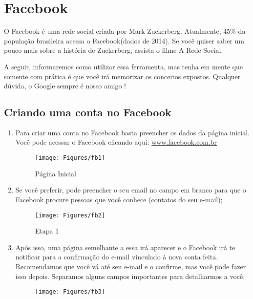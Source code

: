 \documentclass[hidelinks,12pt]{article}
\begin{document}
\section{Facebook}
O Facebook é uma rede social criada por Mark Zuckerberg. Atualmente, 45\% da população brasileira acessa o Facebook(dados de 2014). Se você quiser saber um pouco mais sobre a história de Zuckerberg, assista o filme A Rede Social.

A seguir, informaremos como utilizar essa ferramenta, mas tenha em mente que somente com prática é que você irá memorizar os conceitos expostos. Qualquer dúvida, o Google sempre é nosso amigo !

\subsection{Criando uma conta no Facebook}
\begin{enumerate}
	\item Para criar uma conta no Facebook basta preencher os dados da página inicial. Você pode acessar o Facebook clicando aqui: \url{www.facebook.com.br}

	\begin{figure}[!h]
		\centering
		\texttt{[image: Figures/fb1]}
		\label{fig:paginafb}
		\caption{Página Inicial}
	\end{figure}

	\item Se você preferir, pode preencher o seu email no campo em branco para que o Facebook procure pessoas que você conhece (contatos do seu e-mail);

	\begin{figure}[!h]
		\centering
		\texttt{[image: Figures/fb2]}
		\label{fig:paginaf2}
		\caption{Etapa 1}
	\end{figure}

	\item Após isso, uma página semelhante a essa irá aparecer e o Facebook irá te notificar para a confirmação do e-mail vinculado à nova conta feita. Recomendamos que você vá até seu e-mail e o confirme, mas você pode fazer isso depois.
	Separamos alguns campos importantes para detalharmos a você.

	\begin{figure}[!h]
		\centering
		\texttt{[image: Figures/fb3]}
		\label{fig:paginaf3}
	\end{figure}
\end{enumerate}
\end{document}

